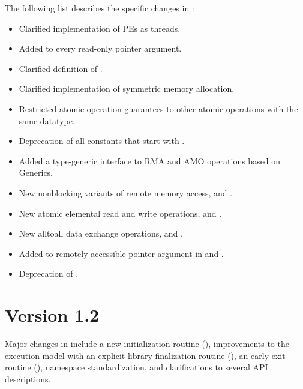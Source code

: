 The following list describes the specific changes in \openshmem[1.3]:
\begin{itemize}
%
\item Clarified implementation of \acp{PE} as threads.
%
\item Added  to every read-only pointer argument.
%
\item Clarified definition of .
%
%
\item Clarified implementation of symmetric memory allocation.
%
%
\item Restricted atomic operation guarantees to other atomic operations with the same datatype.
%
%
\item Deprecation of all constants that start with .
%
%
\item Added a type-generic interface to \openshmem \ac{RMA} and \ac{AMO}
    operations based on \Cstd[11] Generics.
%
%
\item New nonblocking variants of remote memory access, 
    and .
%
%
\item New atomic elemental read and write operations,  and
    .
%
%
\item New alltoall data exchange operations, 
    and .
%
%
\item Added  to remotely accessible pointer argument in
     and .
%
%
\item Deprecation of .
%
%
\end{itemize}




\section{Version 1.2}
Major changes in \openshmem[1.2] include
a new initialization routine (),
improvements to the execution model with an explicit
library-finalization routine (),
an early-exit routine (),
namespace standardization,
and clarifications to several \ac{API} descriptions.

